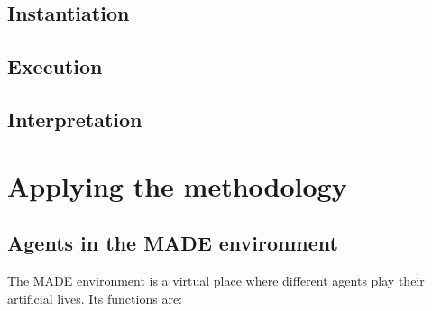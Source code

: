 \documentclass{sig-alternate}
\begin{document}
\subsection{Instantiation}


\subsection{Execution}



\subsection{Interpretation}




\section{Applying the methodology}
\label{sec:applying}

\subsection{Agents in the MADE environment}

The MADE environment is a virtual place where different agents play their artificial lives. Its functions are:
\end{document}
